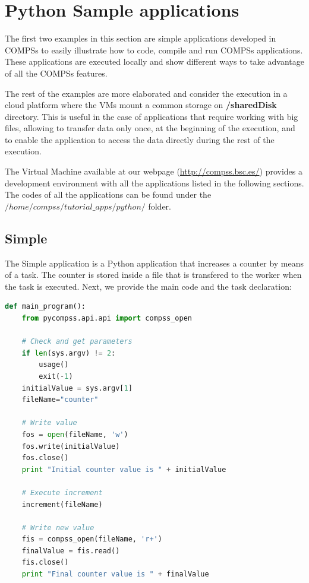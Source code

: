 \section{Python Sample applications}
\label{sec:PythonSampleApps}

The first two examples in this section are simple applications developed in COMPSs to easily illustrate how to code,
compile and run COMPSs applications. These applications are executed locally and show different ways to take advantage
of all the COMPSs features. 

The rest of the examples are more elaborated and consider the execution in a cloud platform where the VMs mount a common 
storage on \textbf{/sharedDisk} directory. This is useful in the case of applications that require working 
with big files, allowing to transfer data only once, at the beginning of the execution, and to enable 
the application to access the data directly during the rest of the execution.

The Virtual Machine available at our webpage (\url{http://compss.bsc.es/}) provides a development environment with
all the applications listed in the following sections. The codes of all the applications can be found under the 
$/home/compss/tutorial\_apps/python/$ folder. 

\subsection{Simple}
The Simple application is a Python application that increases a counter by means of a task. The counter is stored inside a file that 
is transfered to the worker when the task is executed. Next, we provide the main code and the task declaration:

\begin{lstlisting}[language=python]
def main_program():
    from pycompss.api.api import compss_open

    # Check and get parameters
    if len(sys.argv) != 2:
        usage()
        exit(-1)
    initialValue = sys.argv[1]
    fileName="counter"

    # Write value
    fos = open(fileName, 'w')
    fos.write(initialValue)
    fos.close()
    print "Initial counter value is " + initialValue

    # Execute increment
    increment(fileName)

    # Write new value
    fis = compss_open(fileName, 'r+')
    finalValue = fis.read()
    fis.close()
    print "Final counter value is " + finalValue
\end{lstlisting}

